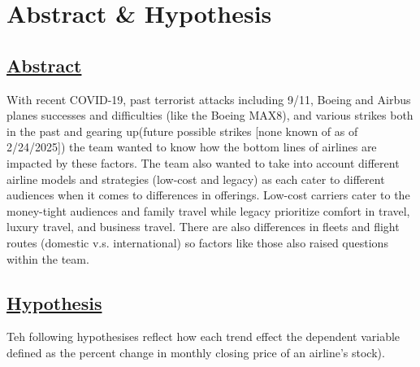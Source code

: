 \documentclass[12pt]{report}
\begin{document}

    \newpage
{}
    \newpage


\newpage
\tableofcontents
\newpage

\chapter*{Abstract \& Hypothesis}
\section*{\underline{Abstract}}
With recent COVID-19, past terrorist attacks including 9/11, Boeing and Airbus planes successes and difficulties (like the Boeing MAX8), and various strikes both in the past and gearing up(future possible strikes [none known of as of 2/24/2025]) the team wanted to know how the bottom lines of airlines are impacted by these factors.
The team also wanted to take into account different airline models and strategies (low-cost and legacy) as each cater to different audiences when it comes to differences in offerings.
Low-cost carriers cater to the money-tight audiences and family travel while legacy prioritize comfort in travel, luxury travel, and business travel.
There are also differences in fleets and flight routes (domestic v.s. international) so factors like those also raised questions within the team.
\newpage
\section*{\underline{Hypothesis}}
Teh following hypothesises reflect how each trend effect the dependent variable defined as the percent change in monthly closing price of an airline's stock).
\end{document}
